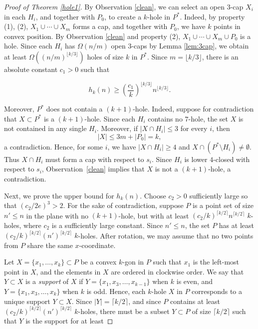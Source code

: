 \documentclass[11pt]{article}
\theoremstyle{plain}
\theoremstyle{definition}
\theoremstyle{remark}
\begin{document}
\begin{proof}[Proof of Theorem \ref{hole1}]
By Observation \ref{clean}, we can select an open 3-cap $X_i$ in each $H_i$, and together with $P_0$, to create a $k$-hole in $P^{\ast}$.  Indeed, by property (1), (2), $X_1\cup \cdots \cup X_m$ forms a cap, and together with $P_0$, we have $k$ points in convex position.  By Observation \ref{clean} and property (2), $X_1\cup \cdots \cup X_m \cup P_0$ is a hole.  Since each $H_i$ has $\Omega(n/m)$ open 3-caps by Lemma \ref{lem:3cap}, we obtain at least $\Omega((n/m)^{\lfloor k/3\rfloor})$ holes of size $k$ in $P^{\ast}$.  Since $ m = \lfloor k/3\rfloor$, there is an absolute constant $c_1 > 0$ such that   

$$h_k(n) \geq \left(\frac{c_1}{k}\right)^{\lfloor k/3\rfloor }n^{\lfloor k/3\rfloor}.$$ 


Moreover, \(P^{\ast}\) does not contain a \((k+1)\)-hole.  Indeed, suppose
for contradiction that \(X\subset P^{\ast}\) is a \((k+1)\)-hole.  Since each
\(H_i\) contains no \(7\)-hole, the set \(X\) is not contained in any single
\(H_i\).  Moreover, if \(|X\cap H_i|\le 3\) for every \(i\), then
\[
        |X|\le 3m+|P_0|=k,
\]
a contradiction.  Hence, for some \(i\), we have \(|X\cap H_i|\ge 4\) and
\(X\cap(P^{\ast}\setminus H_i)\neq\emptyset\).  Thus \(X\cap H_i\) must form
a cap with respect to \(s_i\).  Since \(H_i\) is lower \(4\)-closed with
respect to \(s_i\), Observation~\ref{clean} implies that \(X\) is not a
\((k+1)\)-hole, a contradiction.


 
\medskip

Next, we prove the upper bound for \(h_k(n)\). Choose \(c_2>0\) sufficiently large so that \((c_2/2e)^3>2\).  For the sake of contradiction, suppose \(P\) is a point set of size \(n'\le n\) in the plane with no \((k+1)\)-hole, but with at least \(\left(c_2/k\right)^{\lceil k/2\rceil} n^{\lceil k/2\rceil}\) \(k\)-holes, where \(c_2\) is a sufficiently large constant. Since \(n'\le n\), the set \(P\) has at least \(\left(c_2/k\right)^{\lceil k/2\rceil}(n')^{\lceil k/2\rceil}\) \(k\)-holes. After rotation, we may assume that no two points from $P$ share the same $x$-coordinate. 

Let $X = \{x_1,\ldots, x_k\}\subset P$ be a convex $k$-gon in $P$ such that $x_1$ is the left-most point in $X$, and the elements in $X$ are ordered in clockwise order.  We say that $Y\subset X$ is a \emph{support} of $X$ if $Y  = \{x_1,x_3,\ldots, x_{k-1}\}$ when $k$ is even, and $Y = \{x_1,x_3,\ldots, x_k\}$ when $k$ is odd. Hence, each $k$-hole $X$ in $P$ corresponds to a unique support $Y\subset X$.  Since $|Y| = \lceil k/2\rceil$, and since \(P\) contains at least \(\left(c_2/k\right)^{\lceil k/2\rceil}(n')^{\lceil k/2\rceil}\) \(k\)-holes, there must be a subset $Y\subset P$ of size $\lceil k/2\rceil$ such that $Y$ is the support for at least


\end{proof}
\end{document}
